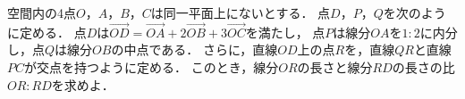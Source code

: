 \documentclass[../../main.tex]{subfiles}
\begin{document}
空間内の4点$O$，$A$，$B$，$C$は同一平面上にないとする．
点$D$，$P$，$Q$を次のように定める．
点$D$は$\overrightarrow{OD}=\overrightarrow{OA}+2\overrightarrow{OB}+3\overrightarrow{OC}$を満たし，
点$P$は線分$OA$を$1:2$に内分し，点$Q$は線分$OB$の中点である．
さらに，直線$OD$上の点$R$を，直線$QR$と直線$PC$が交点を持つように定める．
このとき，線分$OR$の長さと線分$RD$の長さの比$OR:RD$を求めよ．
\end{document}
